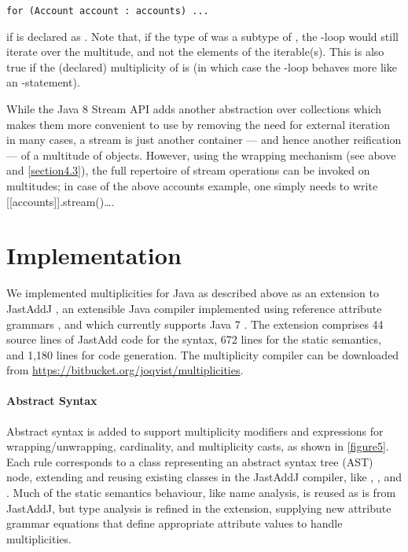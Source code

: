 {\begin{lstlisting}
for (Account account : accounts) ...
\end{lstlisting}

\noindent if  is declared as  . Note that,
if the type of  was a subtype of
, the -loop would still iterate over the multitude, and
not the elements of the iterable(s). This is also true if the (declared)
multiplicity of  is  (in which case the
-loop behaves more like an -statement).

While the Java 8 Stream API adds another abstraction over collections
which makes them more convenient to use by removing the need for external
iteration in many cases, a stream is just another container --- and hence
another reification --- of a multitude of objects. However, using the
wrapping mechanism (see above and \autoref{section4.3}), the full repertoire of
stream operations can be invoked on multitudes; in case of the above
accounts example, one simply needs to write \textsf{[[accounts]].stream()\ldots}.

\section{Implementation}
\label{section5}

\noindent We implemented multiplicities for Java as described above as an
extension to JastAddJ \cite{ref13}, an extensible Java compiler implemented using
reference attribute grammars \cite{ref12, ref20}, and which currently supports Java 7
\cite{ref30}. The extension comprises 44 source lines of JastAdd code for the
syntax, 672 lines for the static semantics, and 1,180 lines for code
generation. The multiplicity compiler can be downloaded from
\url{https://bitbucket.org/joqvist/multiplicities}.

\paragraph{Abstract Syntax} Abstract syntax is added to support multiplicity modifiers
and expressions for wrapping/unwrapping, cardinality, and multiplicity
casts, as shown in \autoref{figure5}. Each rule corresponds to a class representing
an abstract syntax tree (AST) node, extending and reusing existing classes
in the JastAddJ compiler, like , , and
. Much of the static semantics behaviour, like name analysis, is
reused as is from JastAddJ, but type analysis is refined in the extension,
supplying new attribute grammar equations that define appropriate attribute
values to handle multiplicities.

}
